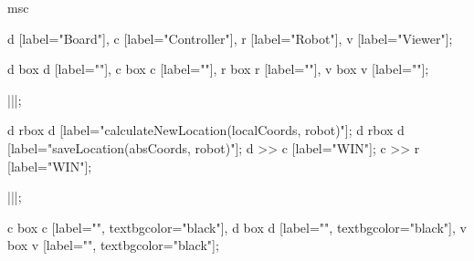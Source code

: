 \begin{msc}
msc
{

d [label="Board"],
c [label="Controller"],
r [label="Robot"],
v [label="Viewer"];


d box d [label=""],
c box c [label=""],
r box r [label=""],
v box v [label=""];


|||;

d rbox d [label="calculateNewLocation(localCoords, robot)"];
d rbox d [label="saveLocation(absCoords, robot)"];
d >> c [label="WIN"];
c >> r [label="WIN"];


|||;

c box c [label="", textbgcolor="black"],
d box d [label="", textbgcolor="black"],
v box v [label="", textbgcolor="black"];

}
\end{msc}

